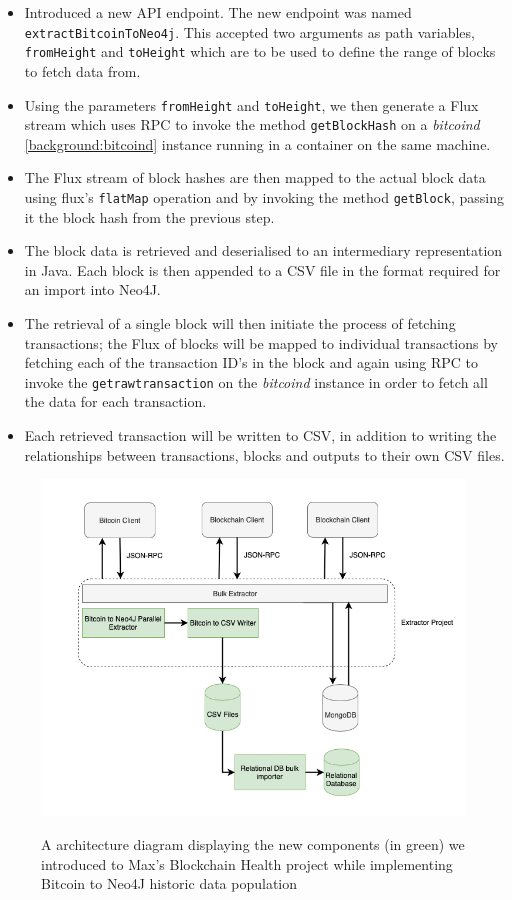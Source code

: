 \begin{itemize}
    \item Introduced a new API endpoint. The new endpoint was named \texttt{extractBitcoinToNeo4j}. This accepted two arguments as path variables, \texttt{fromHeight} and \texttt{toHeight} which are to be used to define the range of blocks to fetch data from. 
    \item Using the parameters \texttt{fromHeight} and \texttt{toHeight}, we then generate a Flux stream which uses RPC to invoke the method \texttt{getBlockHash} on a \textit{bitcoind} \ref{background:bitcoind} instance running in a container on the same machine. 
    \item The Flux stream of block hashes are then mapped to the actual block data using flux's \texttt{flatMap} operation and by invoking the method \texttt{getBlock}, passing it the block hash from the previous step. 
    \item The block data is retrieved and deserialised to an intermediary representation in Java. Each block is then appended to a CSV file in the format required for an import into Neo4J. 
    \item The retrieval of a single block will then initiate the process of fetching transactions; the Flux of blocks will be mapped to individual transactions by fetching each of the transaction ID's in the block and again using RPC to invoke the \texttt{getrawtransaction} on the \textit{bitcoind} instance in order to fetch all the data for each transaction. 
    \item Each retrieved transaction will be written to CSV, in addition to writing the relationships between transactions, blocks and outputs to their own CSV files. 
\end{itemize}

\begin{figure}[h!]
  \centering
  \includegraphics[width = 15cm]{./figures/adding-bitcoin-extractor-diagram}\\[0.5cm] 
  \caption{A architecture diagram displaying the new components (in green) we introduced to Max's Blockchain Health project while implementing Bitcoin to Neo4J historic data population}
  \label{fig:neo4j-layout}
\end{figure}

